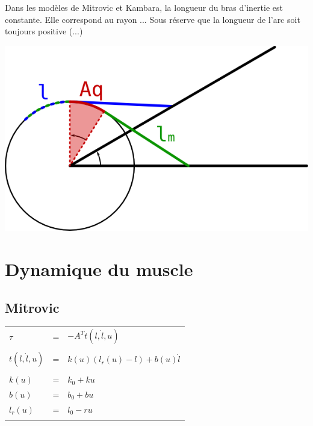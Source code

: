 \documentclass[pdftex,a4paper,11pt]{article}
\begin{document}
Dans les modèles de Mitrovic et Kambara, la longueur du bras d'inertie est constante. Elle correspond au rayon ...
Sous réserve que la longueur de l'arc soit toujours positive (...)

\begin{center}
        \includegraphics[width=.50\linewidth]{fig/muscle_length}
\end{center}


\section{Dynamique du muscle}

\subsection{Mitrovic}

\begin{tabular}{lcl}
    $\tau$ & = & $-A^T t(l, \dot{l}, u)$ \\
    \\
    $t(l, \dot{l}, u)$        & = & $k(u) (l_r(u) - l) + b(u) \dot{l}$ \\
    \\
    $k(u)$    & = & $k_0 + k u$ \\
    $b(u)$    & = & $b_0 + b u$ \\
    $l_r(u)$  & = & $l_0 - r u$ \\
    \\
\end{tabular}
\end{document}
